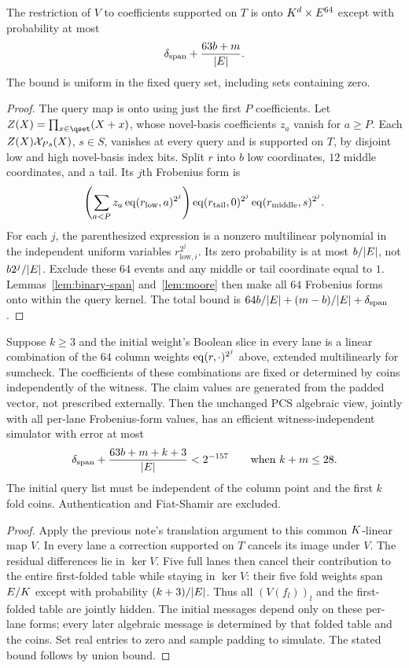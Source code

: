 \begin{lemma}\label{lem:ring-bank}
The restriction of $V$ to coefficients supported on $T$ is onto $K^d\times E^{64}$ except with probability at most
\[
 \delta_{\mathrm{span}}+\frac{63b+m}{|E|}.
\]
The bound is uniform in the fixed query set, including sets containing zero.
\end{lemma}
\begin{proof}
The query map is onto using just the first $P$ coefficients. Let $Z(X)=\prod_{x\in\qset}(X+x)$, whose novel-basis coefficients $z_a$ vanish for $a\ge P$. Each $Z(X)\mathcal{X}_{Ps}(X)$, $s\in S$, vanishes at every query and is supported on $T$, by disjoint low and high novel-basis index bits. Split $r$ into $b$ low coordinates, $12$ middle coordinates, and a tail. Its $j$th Frobenius form is
\[
 \left(\sum_{a<P}z_a\operatorname{eq}(r_{\mathrm{low}},a)^{2^j}\right)
 \operatorname{eq}(r_{\mathrm{tail}},0)^{2^j}\operatorname{eq}(r_{\mathrm{middle}},s)^{2^j}.
\]
For each $j$, the parenthesized expression is a nonzero multilinear polynomial in the independent uniform variables $r_{\mathrm{low},i}^{2^j}$. Its zero probability is at most $b/|E|$, not $b2^j/|E|$. Exclude these $64$ events and any middle or tail coordinate equal to $1$. Lemmas~\ref{lem:binary-span} and~\ref{lem:moore} then make all $64$ Frobenius forms onto within the query kernel. The total bound is $64b/|E|+(m-b)/|E|+\delta_{\mathrm{span}}$.
\end{proof}

\begin{theorem}\label{thm:ring-pcs}
Suppose $k\ge3$ and the initial weight's Boolean slice in every lane is a linear combination of the $64$ column weights $\operatorname{eq}(r,\cdot)^{2^j}$ above, extended multilinearly for sumcheck. The coefficients of these combinations are fixed or determined by coins independently of the witness. The claim values are generated from the padded vector, not prescribed externally. Then the unchanged PCS algebraic view, jointly with all per-lane Frobenius-form values, has an efficient witness-independent simulator with error at most
\[
 \delta_{\mathrm{span}}+\frac{63b+m+k+3}{|E|}<2^{-157}
 \qquad\text{when }k+m\le28.
\]
The initial query list must be independent of the column point and the first $k$ fold coins. Authentication and Fiat-Shamir are excluded.
\end{theorem}
\begin{proof}
Apply the previous note's translation argument to this common $K$-linear map $V$. In every lane a correction supported on $T$ cancels its image under $V$. The residual differences lie in $\ker V$. Five full lanes then cancel their contribution to the entire first-folded table while staying in $\ker V$: their five fold weights span $E/K$ except with probability $(k+3)/|E|$. Thus all $(V(f_l))_l$ and the first-folded table are jointly hidden. The initial messages depend only on these per-lane forms; every later algebraic message is determined by that folded table and the coins. Set real entries to zero and sample padding to simulate. The stated bound follows by union bound.
\end{proof}

